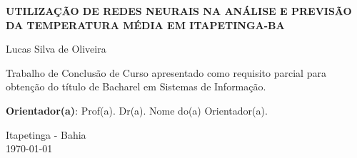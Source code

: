 \documentclass[12pt, openright, a4paper, brazil, oneside]{abntex2}
\begin{document}
    \begin{folhaderosto}

        \begin{center}
            \ABNTEXchapterfont\bfseries\LARGE UTILIZAÇÃO DE REDES NEURAIS NA ANÁLISE E PREVISÃO DA TEMPERATURA MÉDIA EM ITAPETINGA-BA
        \end{center}

        \vspace{4cm}

        \begin{center}
            {\ABNTEXchapterfont\large Lucas Silva de Oliveira}
        \end{center}

        \vspace{4cm}

        \vspace*{\fill}
        \begin{flushright}
            \begin{minipage}{8.6cm}
                Trabalho de Conclusão de Curso apresentado como 
                requisito parcial para obtenção 
                do título de Bacharel em Sistemas de Informação.
                
                \vspace{0.5cm}
                \textbf{Orientador(a)}: Prof(a). Dr(a). Nome do(a) Orientador(a).
            \end{minipage}
        \end{flushright}

        \vspace{5.5cm}

        \begin{center}
            \large Itapetinga - Bahia\\
            \today
        \end{center}

    \end{folhaderosto}
\end{document}
